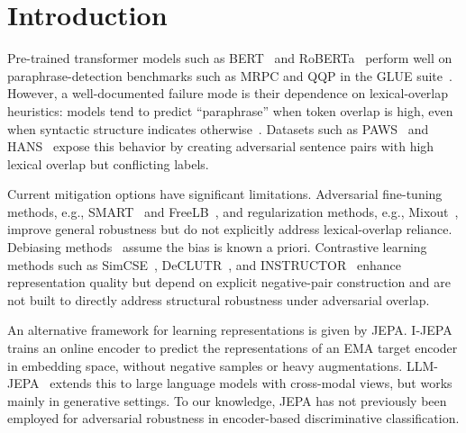 \documentclass[sigconf]{acmart}
\begin{document}


\maketitle

\section{Introduction}
Pre-trained transformer models such as BERT~\cite{devlin2019bert} and RoBERTa~\cite{liu2019roberta} perform well on paraphrase-detection benchmarks such as MRPC and QQP in the GLUE suite~\cite{wang2019glue}. However, a well-documented failure mode is their dependence on lexical-overlap heuristics: models tend to predict ``paraphrase'' when token overlap is high, even when syntactic structure indicates otherwise~\cite{mccoy2019right}. Datasets such as PAWS~\cite{zhang2019paws} and HANS~\cite{mccoy2019right} expose this behavior by creating adversarial sentence pairs with high lexical overlap but conflicting labels.

Current mitigation options have significant limitations. Adversarial fine-tuning methods, e.g., SMART~\cite{jiang2020smart} and FreeLB~\cite{zhu2020freelb}, and regularization methods, e.g., Mixout~\cite{lee2020mixout}, improve general robustness but do not explicitly address lexical-overlap reliance. Debiasing methods~\cite{clark2019dont,utama2020towards} assume the bias is known a priori. Contrastive learning methods such as SimCSE~\cite{gao2021simcse}, DeCLUTR~\cite{giorgi2021declutr}, and INSTRUCTOR~\cite{su2023instructor} enhance representation quality but depend on explicit negative-pair construction and are not built to directly address structural robustness under adversarial overlap.

An alternative framework for learning representations is given by JEPA. I-JEPA~\cite{assran2023ijepa} trains an online encoder to predict the representations of an EMA target encoder in embedding space, without negative samples or heavy augmentations. LLM-JEPA~\cite{huang2025llmjepa} extends this to large language models with cross-modal views, but works mainly in generative settings. To our knowledge, JEPA has not previously been employed for adversarial robustness in encoder-based discriminative classification.
\end{document}
